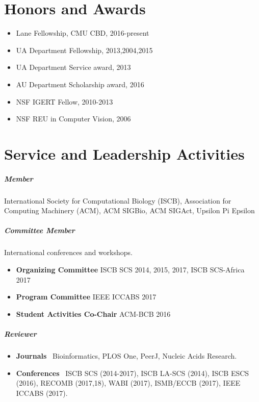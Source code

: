 \documentclass[10pt,letterpaper]{article}
\begin{document}
\section*{Honors and Awards}

\begin{itemize}
    \item Lane Fellowship, CMU CBD, 2016-present
    \item UA Department Fellowship, 2013,2004,2015
    \item UA Department Service award, 2013
    \item AU Department Scholarship award, 2016
    \item NSF IGERT Fellow, 2010-2013
    \item NSF REU in Computer Vision, 2006
\end{itemize}


\section*{Service and Leadership Activities}

\subparagraph{Member} International Society for Computational Biology (ISCB), Association for Computing Machinery (ACM), ACM SIGBio, ACM SIGAct, Upsilon Pi Epsilon
\subparagraph{Committee Member} International conferences and workshops.
\begin{itemize}
    \item \textbf{Organizing Committee} ISCB SCS 2014, 2015, 2017, ISCB SCS-Africa 2017 
    \item \textbf{Program Committee} IEEE ICCABS 2017
    \item \textbf{Student Activities Co-Chair} ACM-BCB 2016
\end{itemize}

\subparagraph{Reviewer} %
\begin{itemize}
    \item \textbf{Journals} \ 
        Bioinformatics,
        PLOS One, 
        PeerJ, 
        Nucleic Acids Research. 
    \item \textbf{Conferences} \ 
        ISCB SCS (2014-2017), %
        ISCB LA-SCS (2014), %
        ISCB ESCS (2016), 
	RECOMB (2017,18), %
	WABI (2017), %
	ISMB/ECCB (2017), %
    	 IEEE ICCABS (2017). %
\end{itemize}
\end{document}
